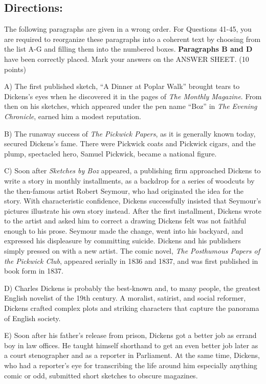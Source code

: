 \documentclass[UTF8,11pt]{ctexart}
\begin{document}
\subsection*{\textbf{Directions:}}


The following paragraphs are given in a wrong order. For Questions 41-45, you are required to reorganize these paragraphs into a coherent text by choosing from the list A-G and filling them into the numbered boxes. \textbf{Paragraphs B and D} have been correctly placed. Mark your answers on the ANSWER SHEET. (10 points)


A) The first published sketch, “A Dinner at Poplar Walk” brought tears to Dickens’s eyes when he discovered it in the pages of \textit{The Monthly Magazine}. From then on his sketches, which appeared under the pen name “Boz” in \textit{The Evening Chronicle}, earned him a modest reputation.


B) The runaway success of \textit{The Pickwick Papers}, as it is generally known today, secured Dickens’s fame. There were Pickwick coats and Pickwick cigars, and the plump, spectacled hero, Samuel Pickwick, became a national figure.


C) Soon after \textit{Sketches by Boz} appeared, a publishing firm approached Dickens to write a story in monthly installments, as a backdrop for a series of woodcuts by the then-famous artist Robert Seymour, who had originated the idea for the story. With characteristic confidence, Dickens successfully insisted that Seymour’s pictures illustrate his own story instead. After the first installment, Dickens wrote to the artist and asked him to correct a drawing Dickens felt was not faithful enough to his prose. Seymour made the change, went into his backyard, and expressed his displeasure by committing suicide. Dickens and his publishers simply pressed on with a new artist. The comic novel, \textit{The} \textit{Posthumous Papers of the Pickwick Club}, appeared serially in 1836 and 1837, and was first published in book form in 1837.


D) Charles Dickens is probably the best-known and, to many people, the greatest English novelist of the 19th century. A moralist, satirist, and social reformer, Dickens crafted complex plots and striking characters that capture the panorama of English society.


E) Soon after his father’s release from prison, Dickens got a better job as errand boy in law offices. He taught himself shorthand to get an even better job later as a court stenographer and as a reporter in Parliament. At the same time, Dickens, who had a reporter’s eye for transcribing the life around him especially anything comic or odd, submitted short sketches to obscure magazines.
\end{document}
